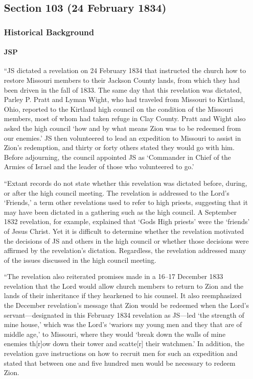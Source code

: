 \subsection{Section 103 (24 February 1834)}
	\label{DC103}
	
	\subsubsection{Historical Background}
		\label{DC103-HB}
		
		\paragraph{JSP}
		
			``JS dictated a revelation on 24 February 1834 that instructed the church how to restore Missouri members to their Jackson County lands, from which they had been driven in the fall of 1833. The same day that this revelation was dictated, Parley P. Pratt and Lyman Wight, who had traveled from Missouri to Kirtland, Ohio, reported to the Kirtland high council on the condition of the Missouri members, most of whom had taken refuge in Clay County. Pratt and Wight also asked the high council `how and by what means Zion was to be redeemed from our enemies.' JS then volunteered to lead an expedition to Missouri to assist in Zion's redemption, and thirty or forty others stated they would go with him. Before adjourning, the council appointed JS as `Commander in Chief of the Armies of Israel and the leader of those who volunteered to go.'
			
			``Extant records do not state whether this revelation was dictated before, during, or after the high council meeting. The revelation is addressed to the Lord's `Friends,' a term other revelations used to refer to high priests, suggesting that it may have been dictated in a gathering such as the high council. A September 1832 revelation, for example, explained that `Gods High priests' were the `friends' of Jesus Christ. Yet it is difficult to determine whether the revelation motivated the decisions of JS and others in the high council or whether those decisions were affirmed by the revelation's dictation. Regardless, the revelation addressed many of the issues discussed in the high council meeting.
			
			``The revelation also reiterated promises made in a 16--17 December 1833 revelation that the Lord would allow church members to return to Zion and the lands of their inheritance if they hearkened to his counsel. It also reemphasized the December revelation's message that Zion would be redeemed when the Lord's servant---designated in this February 1834 revelation as JS---led `the strength of mine house,' which was the Lord's `wariors my young men and they that are of middle age,' to Missouri, where they would `break down the walls of mine enemies th[r]ow down their tower and scatte[r] their watchmen.' In addition, the revelation gave instructions on how to recruit men for such an expedition and stated that between one and five hundred men would be necessary to redeem Zion.
			
